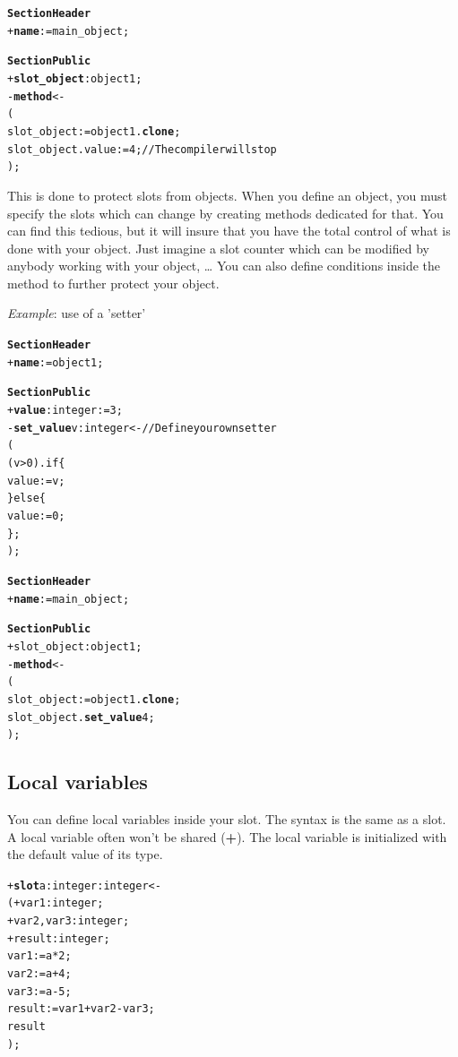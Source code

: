 \documentclass[11pt]{mybook}
\begin{document}
\begin{alltt}
{\bf{}Section Header}
  + {\bf{}name}     := {\sc{}main\_object};

{\bf{}Section Public}
  + {\bf{}slot\_object}:{\sc{}object1};
  - {\bf{}method} <-
  (
    slot\_object := {\sc{}object1}.{\bf{}clone};
    slot\_object.value := 4;              // The compiler will stop
  );
\end{alltt}

This is done to protect slots from objects. When you define an object, you must specify the slots which can change by creating methods dedicated for that.
You can find this tedious, but it will insure that you have the total control of what is done with your object. Just imagine a slot counter which can be modified by anybody working with your object, \ldots
You can also define conditions inside the method to further protect your object.

{\it{}Example}: use of a 'setter'
\begin{alltt}
{\bf{}Section Header}
  + {\bf{}name}     := {\sc{}object1};

{\bf{}Section Public}
  + {\bf{}value}:{\sc{}integer}  := 3;
  - {\bf{}set\_value} v:{\sc{}integer} <-   // Define your own setter
  (
     (v > 0).if \{
       value := v;
     \} else \{
       value := 0;
     \};
  );
\end{alltt}

\begin{alltt}
{\bf{}Section Header}
  + {\bf{}name}     := {\sc{}main\_object};

{\bf{}Section Public}
  + slot\_object:{\sc{}object1};
  - {\bf{}method} <-
  (
    slot\_object := {\sc{}object1}.{\bf{}clone};
    slot\_object.{\bf{}set\_value} 4;
  );
\end{alltt}

\subsection{Local variables}
\label{quickstart:slots:local_variables}
%
You can define local variables inside your slot.
The syntax is the same as a slot. A local variable often won't be shared ({\bf{}+}).
The local variable is initialized with the default value of its type.

\begin{alltt}
  + {\bf{}slot} a:{\sc{}integer} :{\sc{}integer}  <- 
  ( + var1:{\sc{}integer};
    + var2,var3:{\sc{}integer};
    + result:{\sc{}integer};
    var1 := a * 2;
    var2 := a + 4;
    var3 := a - 5;
    result := var1 + var2 - var3;
    result
  );
\end{alltt}
\end{document}
